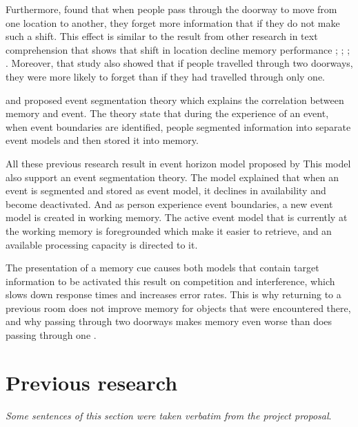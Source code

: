 
Furthermore, \cite{Radvansky2010} found that when people pass through the doorway to move from
one location to another, they forget more information that if they do not make such a shift. This
effect is similar to the result from other research in text comprehension that shows that shift
in location decline memory performance \citep{Curiel2002}; \citep{Haenggi1995}; \citep{Radvansky2010}; \citep{Radvansky2003}.
Moreover, that study also showed that if people travelled through two doorways, they were more
likely to forget than if they had travelled through only one.

\cite{Kurby2008} and \cite{Swallow2009} proposed event segmentation theory
which explains the correlation between memory and event.
 The theory state that during the experience of an event,
 when event boundaries are identified, people segmented information into separate event models and then stored it into memory.

All these previous research result in event horizon model proposed by \cite{Radvansky2012}
This model also support an event segmentation theory. The model explained that when an event is
segmented and stored as event model, it declines in availability and become deactivated. And
as person experience event boundaries, a new event model is created in working memory. The
active event model that is currently at the working memory is foregrounded which make it easier
to retrieve, and an available processing capacity is directed to it.

The presentation of a memory cue causes both models that contain target information to
be activated this result on competition and interference, which slows down response times and
increases error rates. This is why returning to a previous room does not improve memory for
objects that were encountered there, and why passing through two doorways makes memory even
worse than does passing through one \citep{Radvansky2011}.


\section{Previous research}
\textit{Some sentences of this section were taken verbatim from the project proposal}.

